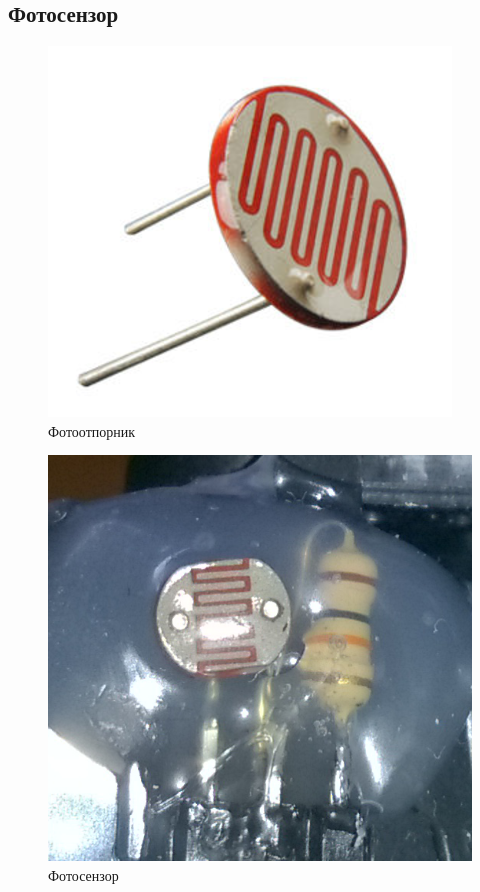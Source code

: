 \subsection{Фотосензор}
	\begin{figure}[htb!]
		\begin{center}
			\includegraphics[scale=.2]{pictures/PhotoResistor}
			\caption{Фотоотпорник} \label{PhotoResistor}
		\end{center}
	\end{figure}		
	\begin{figure}[htb!]
		\begin{center}
			\includegraphics[scale=.15]{pictures/PhotoSensor}
			\caption{Фотосензор} \label{PhotoSensor}
		\end{center}
	\end{figure}		
